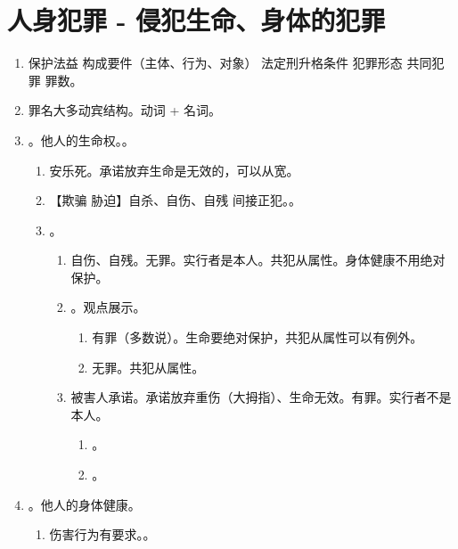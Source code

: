 \section{人身犯罪 - 侵犯生命、身体的犯罪}
\begin{enumerate}
  \item 保护法益 \yjt 构成要件（主体、行为、对象） \yjt 法定刑升格条件 \yjt 犯罪形态 \yjt 共同犯罪 \yjt 罪数。
  \item 罪名大多动宾结构。动词 + 名词。
  \item {}。他人的生命权。。
        \begin{enumerate}
          \item 安乐死。承诺放弃生命是无效的，可以从宽。
          \item 【欺骗 \hz 胁迫】自杀、自伤、自残 \yjt 间接正犯。。
          \item {}。
                \begin{enumerate}
                  \item 自伤、自残。无罪。实行者是本人。共犯从属性。身体健康不用绝对保护。
                  \item {}。观点展示。
                        \begin{enumerate}
                          \item 有罪（多数说）。生命要绝对保护，共犯从属性可以有例外。
                          \item 无罪。共犯从属性。
                        \end{enumerate}
                  \item 被害人承诺。承诺放弃重伤（大拇指）、生命无效。有罪。实行者不是本人。
                        \begin{enumerate}
                          \item {}。
                          \item {}。
                        \end{enumerate}
                \end{enumerate}
        \end{enumerate}
  \item {}。他人的身体健康。
        \begin{enumerate}
          \item 伤害行为有要求。。

\end{enumerate}
\end{enumerate}
